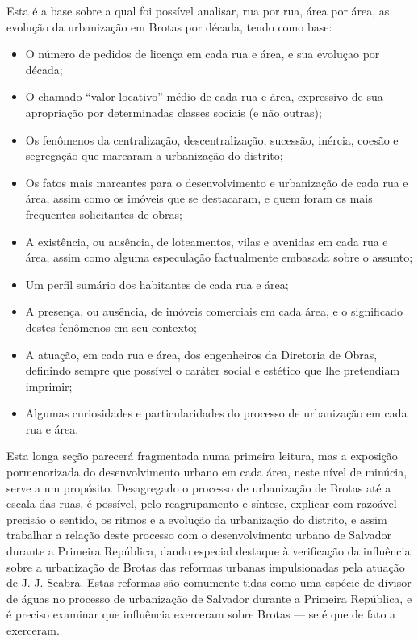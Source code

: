 Esta é a base sobre a qual foi possível analisar, rua por rua, área por área, as evolução da urbanização em Brotas por década, tendo como base:

\begin{itemize}
\item O número de pedidos de licença em cada rua e área, e sua evoluçao por década;
\item O chamado ``valor locativo'' médio de cada rua e área, expressivo de sua apropriação por determinadas classes sociais (e não outras);
\item Os fenômenos da centralização, descentralização, sucessão, inércia, coesão e segregação que marcaram a urbanização do distrito; 
\item Os fatos mais marcantes para o desenvolvimento e urbanização de cada rua e área, assim como os imóveis que se destacaram, e quem foram os mais frequentes solicitantes de obras;
\item A existência, ou ausência, de loteamentos, vilas e avenidas em cada rua e área, assim como alguma especulação factualmente embasada sobre o assunto; 
\item Um perfil sumário dos habitantes de cada rua e área;
\item A presença, ou ausência, de imóveis comerciais em cada área, e o significado destes fenômenos em seu contexto;
\item A atuação, em cada rua e área, dos engenheiros da Diretoria de Obras, definindo sempre que possível o caráter social e estético que lhe pretendiam imprimir;
\item Algumas curiosidades e particularidades do processo de urbanização em cada rua e área.
\end{itemize}

Esta longa seção parecerá fragmentada numa primeira leitura, mas a exposição pormenorizada do desenvolvimento urbano em cada área, neste nível de minúcia, serve a um propósito. Desagregado o processo de urbanização de Brotas até a escala das ruas, é possível, pelo reagrupamento e síntese, explicar com razoável precisão o sentido, os ritmos e a evolução da urbanização do distrito, e assim trabalhar a relação deste processo com o desenvolvimento urbano de Salvador durante a Primeira República, dando especial destaque à verificação da influência sobre a urbanização de Brotas das reformas urbanas impulsionadas pela atuação de J. J. Seabra. Estas reformas são comumente tidas como uma espécie de divisor de águas no processo de urbanização de Salvador durante a Primeira República, e é preciso examinar que influência exerceram sobre Brotas --- se é que de fato a exerceram.

